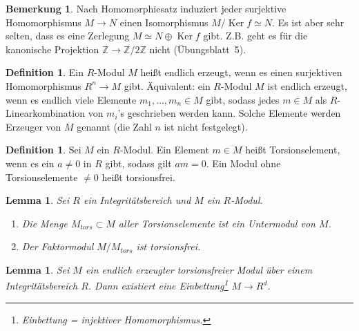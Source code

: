 \documentclass[reqno,12pt]{article}
\numberwithin{equation}{section}
\newcommand{\bZ}{\mathbb{Z}}
\newcommand{\iso}{\simeq}
\newcommand{\Ker}{\text{Ker }}
\theoremstyle{plain}
\newtheorem{lemma}[thm]{Lemma}
\theoremstyle{definition}
\newtheorem{definition}[thm]{Definition}
\newtheorem{remark}[thm]{Bemerkung}
\renewcommand{\Ker}{\operatorname{Ker}}
\begin{document}
\begin{remark}
  Nach Homomorphiesatz induziert jeder surjektive Homomorphismus $M \to N$ einen Isomorphismus $M/\Ker f \iso N$. Es ist aber sehr selten, dass es eine Zerlegung $M \iso N \oplus \Ker f$ gibt. Z.B. geht es für die kanonische Projektion $\bZ \to \bZ/2\bZ$ nicht (Übungsblatt~5).
\end{remark}





\begin{definition}
  Ein $R$-Modul $M$ heißt {\sf endlich erzeugt}, wenn es einen surjektiven Homomorphismus $R^n \to M$ gibt. Äquivalent: ein $R$-Modul $M$ ist endlich erzeugt, wenn es endlich viele Elemente $m_1 , \dots, m_n \in M$ gibt, sodass jedes $m \in M$ als $R$-Linearkombination von $m_i$'s geschrieben werden kann. Solche Elemente werden {\sf Erzeuger} von $M$ genannt (die Zahl $n$ ist nicht festgelegt).
\end{definition}

\begin{definition}
Sei $M$ ein $R$-Modul. Ein Element $m \in M$ heißt {\sf Torsionselement}, wenn es ein $a \neq 0$ in $R$ gibt, sodass gilt $am=0$. Ein Modul ohne Torsionselemente $\neq 0$ heißt {\sf torsionsfrei}.
\end{definition}

\begin{lemma}
Sei $R$ ein Integritätsbereich und $M$ ein $R$-Modul.
\begin{enumerate}
  \item Die Menge $M_{tors} \subset M$ aller Torsionselemente ist ein Untermodul von $M$.
  \item Der Faktormodul $M/M_{tors}$ ist torsionsfrei.
\end{enumerate}
\end{lemma}




\begin{lemma}
Sei $M$ ein endlich erzeugter torsionsfreier Modul über einem Integritätsbereich $R$. Dann existiert eine Einbettung\footnote{Einbettung = injektiver Homomorphismus.} $M \to R^d$.
\end{lemma}
\end{document}
